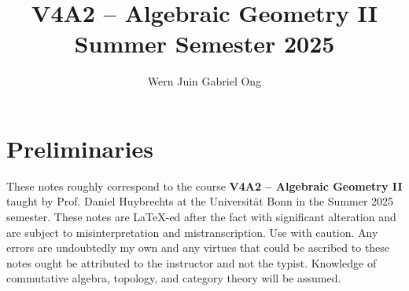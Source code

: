 \documentclass{amsart}
\theoremstyle{definition}
\numberwithin{equation}{section}
\begin{document}
\large
\title[Algebraic Geometry II -- Bonn, Summer 2025]{V4A2 -- Algebraic Geometry II \\ Summer Semester 2025}
\author{Wern Juin Gabriel Ong}
\address{Universit\"{a}t Bonn, Bonn, D-53113}
\maketitle
\section*{Preliminaries}
These notes roughly correspond to the course \textbf{V4A2 -- Algebraic Geometry II} taught by Prof. Daniel Huybrechts at the Universit\"{a}t Bonn in the Summer 2025 semester. These notes are \LaTeX-ed after the fact with significant alteration and are subject to misinterpretation and mistranscription. Use with caution. Any errors are undoubtedly my own and any virtues that could be ascribed to these notes ought be attributed to the instructor and not the typist. Knowledge of commutative algebra, topology, and category theory will be assumed. 
\newpage
\tableofcontents





\newpage
\printbibliography
\end{document}
